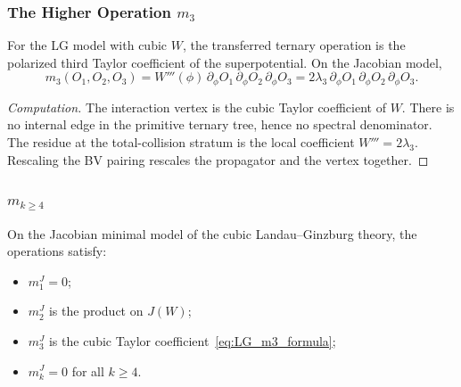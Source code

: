 \subsubsection{The Higher Operation $m_3$}

\begin{proposition}
\label{prop:LG_m3}
For the LG model with cubic \(W\), the transferred ternary operation is
the polarized third Taylor coefficient of the superpotential. On the
Jacobian model,
\begin{equation}
\label{eq:LG_m3_formula}
m_3(O_1,O_2,O_3)=
W'''(\phi)\,\partial_\phi O_1\,\partial_\phi O_2\,\partial_\phi O_3
=2\lambda_3\,\partial_\phi O_1\,\partial_\phi O_2\,\partial_\phi O_3 .
\end{equation}
\end{proposition}

\begin{proof}[Computation]
The interaction vertex is the cubic Taylor coefficient of \(W\).
There is no internal edge in the primitive ternary tree, hence no
spectral denominator. The residue at the total-collision stratum is
the local coefficient \(W'''=2\lambda_3\). Rescaling the BV pairing
rescales the propagator and the vertex together.
\end{proof}

\subsubsection{$m_{k \geq 4}$}

\begin{proposition}
\label{prop:LG_truncation}
On the Jacobian minimal model of the cubic Landau--Ginzburg theory,
the operations satisfy:
\begin{itemize}
\item \(m_1^{J}=0\);
\item \(m_2^{J}\) is the product on \(J(W)\);
\item \(m_3^{J}\) is the cubic Taylor coefficient~\eqref{eq:LG_m3_formula};
\item \(m_k^{J}=0\) for all \(k\geq4\).
\end{itemize}
\end{proposition}

